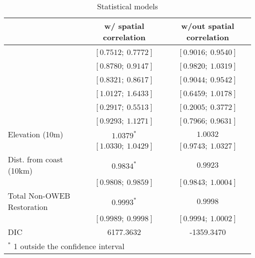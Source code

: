 
\begin{table}
\caption{Statistical models}
\begin{center}
\begin{tabular}{l c c }
\hline
                           & w/ spatial correlation & w/out spatial correlation \\
\hline
\\%
                           & $[0.7512;\ 0.7772]$ & $[0.9016;\ 0.9540]$ \\
\\%
                           & $[0.8780;\ 0.9147]$ & $[0.9820;\ 1.0319]$ \\
\\%
                           & $[0.8321;\ 0.8617]$ & $[0.9044;\ 0.9542]$ \\
\\%
                           & $[1.0127;\ 1.6433]$ & $[0.6459;\ 1.0178]$ \\
\\%
                           & $[0.2917;\ 0.5513]$ & $[0.2005;\ 0.3772]$ \\
\\%
                           & $[0.9293;\ 1.1271]$ & $[0.7966;\ 0.9631]$ \\
Elevation (10m)            & $1.0379^{*}$        & $1.0032$            \\
                           & $[1.0330;\ 1.0429]$ & $[0.9743;\ 1.0327]$ \\
Dist. from coast (10km)    & $0.9834^{*}$        & $0.9923$            \\
                           & $[0.9808;\ 0.9859]$ & $[0.9843;\ 1.0004]$ \\
Total Non-OWEB Restoration & $0.9993^{*}$        & $0.9998$            \\
                           & $[0.9989;\ 0.9998]$ & $[0.9994;\ 1.0002]$ \\
\hline
DIC                        & 6177.3632           & -1359.3470          \\
\hline
\multicolumn{3}{l}{\scriptsize{$^*$ 1 outside the confidence interval}}
\end{tabular}
\label{table:basemods}
\end{center}
\end{table}
